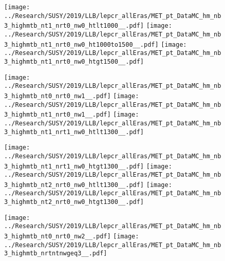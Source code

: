 \begin{figure}[!htb]
  \texttt{[image: ../Research/SUSY/2019/LLB/lepcr\_allEras/MET\_pt\_DataMC\_hm\_nb3\_highmtb\_nt1\_nrt0\_nw0\_htlt1000\_\_.pdf]}
\endminipage\hfill
{}
  \texttt{[image: ../Research/SUSY/2019/LLB/lepcr\_allEras/MET\_pt\_DataMC\_hm\_nb3\_highmtb\_nt1\_nrt0\_nw0\_ht1000to1500\_\_.pdf]}
\endminipage\hfill
{}
  \texttt{[image: ../Research/SUSY/2019/LLB/lepcr\_allEras/MET\_pt\_DataMC\_hm\_nb3\_highmtb\_nt1\_nrt0\_nw0\_htgt1500\_\_.pdf]}
\endminipage
\end{figure}

\begin{figure}[!htb]
  \texttt{[image: ../Research/SUSY/2019/LLB/lepcr\_allEras/MET\_pt\_DataMC\_hm\_nb3\_highmtb\_nt0\_nrt0\_nw1\_\_.pdf]}
\endminipage\hfill
{}
  \texttt{[image: ../Research/SUSY/2019/LLB/lepcr\_allEras/MET\_pt\_DataMC\_hm\_nb3\_highmtb\_nt1\_nrt0\_nw1\_\_.pdf]}
\endminipage\hfill
{}
  \texttt{[image: ../Research/SUSY/2019/LLB/lepcr\_allEras/MET\_pt\_DataMC\_hm\_nb3\_highmtb\_nt1\_nrt1\_nw0\_htlt1300\_\_.pdf]}
\endminipage
\end{figure}

\begin{figure}[!htb]
  \texttt{[image: ../Research/SUSY/2019/LLB/lepcr\_allEras/MET\_pt\_DataMC\_hm\_nb3\_highmtb\_nt1\_nrt1\_nw0\_htgt1300\_\_.pdf]}
\endminipage\hfill
{}
  \texttt{[image: ../Research/SUSY/2019/LLB/lepcr\_allEras/MET\_pt\_DataMC\_hm\_nb3\_highmtb\_nt2\_nrt0\_nw0\_htlt1300\_\_.pdf]}
\endminipage\hfill
{}
  \texttt{[image: ../Research/SUSY/2019/LLB/lepcr\_allEras/MET\_pt\_DataMC\_hm\_nb3\_highmtb\_nt2\_nrt0\_nw0\_htgt1300\_\_.pdf]}
\endminipage\hfill
\end{figure}

\begin{figure}[!htb]
  \texttt{[image: ../Research/SUSY/2019/LLB/lepcr\_allEras/MET\_pt\_DataMC\_hm\_nb3\_highmtb\_nt0\_nrt0\_nw2\_\_.pdf]}
\endminipage\hfill
{}
  \texttt{[image: ../Research/SUSY/2019/LLB/lepcr\_allEras/MET\_pt\_DataMC\_hm\_nb3\_highmtb\_nrtntnwgeq3\_\_.pdf]}
\endminipage
\end{figure}